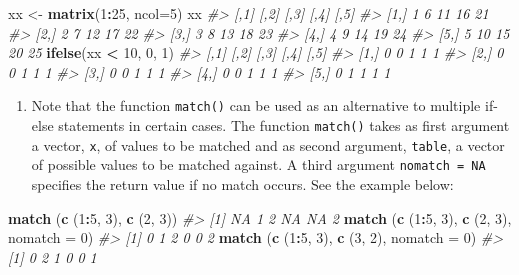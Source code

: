 \documentclass[
]{book}
\newenvironment{Shaded}{\begin{snugshade}}{\end{snugshade}}
\newcommand{\AttributeTok}[1]{\textcolor[rgb]{0.13,0.29,0.53}{#1}}
\newcommand{\CommentTok}[1]{\textcolor[rgb]{0.56,0.35,0.01}{\textit{#1}}}
\newcommand{\DecValTok}[1]{\textcolor[rgb]{0.00,0.00,0.81}{#1}}
\newcommand{\FunctionTok}[1]{\textcolor[rgb]{0.13,0.29,0.53}{\textbf{#1}}}
\newcommand{\NormalTok}[1]{#1}
\newcommand{\OtherTok}[1]{\textcolor[rgb]{0.56,0.35,0.01}{#1}}
\newcommand{\SpecialCharTok}[1]{\textcolor[rgb]{0.81,0.36,0.00}{\textbf{#1}}}
\providecommand{\tightlist}{%
  \setlength{\itemsep}{0pt}\setlength{\parskip}{0pt}}
\begin{document}
\begin{Shaded}
\begin{Highlighting}[]
\NormalTok{xx }\OtherTok{\textless{}{-}} \FunctionTok{matrix}\NormalTok{(}\DecValTok{1}\SpecialCharTok{:}\DecValTok{25}\NormalTok{, }\AttributeTok{ncol=}\DecValTok{5}\NormalTok{)}
\NormalTok{xx}
\CommentTok{\#\textgreater{}      [,1] [,2] [,3] [,4] [,5]}
\CommentTok{\#\textgreater{} [1,]    1    6   11   16   21}
\CommentTok{\#\textgreater{} [2,]    2    7   12   17   22}
\CommentTok{\#\textgreater{} [3,]    3    8   13   18   23}
\CommentTok{\#\textgreater{} [4,]    4    9   14   19   24}
\CommentTok{\#\textgreater{} [5,]    5   10   15   20   25}
\FunctionTok{ifelse}\NormalTok{(xx }\SpecialCharTok{\textless{}} \DecValTok{10}\NormalTok{, }\DecValTok{0}\NormalTok{, }\DecValTok{1}\NormalTok{)}
\CommentTok{\#\textgreater{}      [,1] [,2] [,3] [,4] [,5]}
\CommentTok{\#\textgreater{} [1,]    0    0    1    1    1}
\CommentTok{\#\textgreater{} [2,]    0    0    1    1    1}
\CommentTok{\#\textgreater{} [3,]    0    0    1    1    1}
\CommentTok{\#\textgreater{} [4,]    0    0    1    1    1}
\CommentTok{\#\textgreater{} [5,]    0    1    1    1    1}
\end{Highlighting}
\end{Shaded}

\begin{enumerate}
\def\labelenumi{(\alph{enumi})}
\setcounter{enumi}{4}
\tightlist
\item
  Note that the function \texttt{match()} can be used as an alternative to multiple if-else statements in certain cases. The function \texttt{match()} takes as first argument a vector, \texttt{x}, of values to be matched and as second argument, \texttt{table}, a vector of possible values to be matched against. A third argument \texttt{nomatch\ =\ NA} specifies the return value if no match occurs. See the example below:
\end{enumerate}

\begin{Shaded}
\begin{Highlighting}[]
\FunctionTok{match}\NormalTok{ (}\FunctionTok{c}\NormalTok{ (}\DecValTok{1}\SpecialCharTok{:}\DecValTok{5}\NormalTok{, }\DecValTok{3}\NormalTok{), }\FunctionTok{c}\NormalTok{ (}\DecValTok{2}\NormalTok{, }\DecValTok{3}\NormalTok{))}
\CommentTok{\#\textgreater{} [1] NA  1  2 NA NA  2}
\FunctionTok{match}\NormalTok{ (}\FunctionTok{c}\NormalTok{ (}\DecValTok{1}\SpecialCharTok{:}\DecValTok{5}\NormalTok{, }\DecValTok{3}\NormalTok{), }\FunctionTok{c}\NormalTok{ (}\DecValTok{2}\NormalTok{, }\DecValTok{3}\NormalTok{), }\AttributeTok{nomatch =} \DecValTok{0}\NormalTok{)}
\CommentTok{\#\textgreater{} [1] 0 1 2 0 0 2}
\FunctionTok{match}\NormalTok{ (}\FunctionTok{c}\NormalTok{ (}\DecValTok{1}\SpecialCharTok{:}\DecValTok{5}\NormalTok{, }\DecValTok{3}\NormalTok{), }\FunctionTok{c}\NormalTok{ (}\DecValTok{3}\NormalTok{, }\DecValTok{2}\NormalTok{), }\AttributeTok{nomatch =} \DecValTok{0}\NormalTok{)}
\CommentTok{\#\textgreater{} [1] 0 2 1 0 0 1}
\end{Highlighting}
\end{Shaded}
\end{document}
